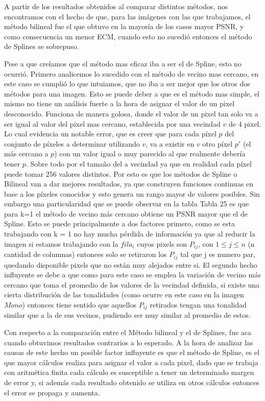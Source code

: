 \documentclass[a4paper]{article}
\newcounter{col}
\begin{document}
A partir de los resultados obtenidos al comparar distintos métodos, nos encontramos con el hecho de que, para las imágenes con las que trabajamos, el método bilineal fue el que obtuvo en la mayoría de los casos mayor PSNR, y como consecuencia un menor ECM, cuando esto no sucedió entonces el método de Splines se sobrepuso. 

Pese a que creíamos que el método mas eficaz iba a ser el de Spline, esto no ocurrió. 
Primero analicemos lo sucedido con el método de vecino mas cercano, en este caso se cumplió lo que intuiamos, que no iba a ser mejor que los otros dos métodos para una imagen. Esto se puede deber a que es el método mas simple, el mismo no tiene un análisis fuerte a la hora de asignar el valor de un pixel desconocido. Funciona de manera golosa, donde el valor de un pixel tan solo va a ser igual al valor del pixel mas cercano, establecida por una vecindad $v$ de 4 pixel. Lo cual evidencia un notable error, que es creer que para cada píxel $p$ del conjunto de píxeles a determinar utilizando $v$, va a existir en $v$ otro píxel $p'$ (el más cercano a $p$) con un valor igual o muy parecido al que realmente debería tener $p$. Sobre todo por el tamaño del a vecindad ya que en realidad cada píxel puede tomar 256 valores distintos. Por esto es que los métodos de Spline o Bilineal van a dar mejores resultados, ya que construyen funciones continuas en base a los píxeles conocidos y esto genera un rango mayor de valores posibles. Sin embargo una particularidad que se puede observar en la tabla Tabla 25 es que para k=1 el m\'etodo de vecino m\'as cercano obtiene un PSNR mayor que el de Spline. Esto se puede principalmente a dos factores primero, como se esta trabajando con k = 1 no hay mucha pérdida de información ya que al reducir la imagen si estamos trabajando con la $fila_i$ cuyos pixels son $P_{ij}$, con $1 \leq j \leq n$ (n cantidad de columnas) entonces solo se retiraron los $P_{ij}$ tal que j es numero par, quedando disponible pixels que no están muy alejados entre si. El  segundo hecho influyente se debe a que como para este caso se emplea la variación de vecino m\'as cercano que toma el promedio de los valores de la vecindad definida, si existe una cierta distribución de las tonalidades (como ocurre en este caso en la imagen $Mono$) entonces tiene sentido que aquellos $P_{ij}$ retirados tengan una tonalidad similar que a la de sus vecinos, pudiendo ser muy similar al promedio de estos. 
\par Con respecto a la comparación entre el Método bilineal y el de Splines, fue aca cuando obtuvimos resultados contrarios a lo esperado. A la hora de analizar las causas de este hecho un posible factor influyente es que el método de Spline, es el que mayor cálculos realiza para asignar el valor a cada pixel, dado que se trabaja con aritmética finita cada c\'alculo es susceptible a tener un determinado margen de error y, si además cada resultado obtenido se utiliza en otros cálculos entonces el error se propaga y aumenta.  
\end{document}
